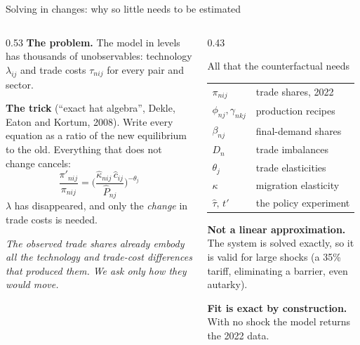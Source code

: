 \documentclass[aspectratio=169,9pt,t]{beamer}
\newcommand{\h}[1]{\hat{#1}}
\newcommand{\plain}[1]{{\color{ipgrey}\small\itshape #1}}
\begin{document}
\begin{frame}{Solving in changes: why so little needs to be estimated}
  \begin{columns}[T]
    \begin{column}{0.53\textwidth}
      \textbf{The problem.} The model in levels has thousands of
      unobservables: technology $\lambda_{ij}$ and trade costs
      $\tau_{nij}$ for every pair and sector.

      \medskip
      \textbf{The trick} (``exact hat algebra'', Dekle, Eaton and Kortum,
      2008). Write every equation as a ratio of the new equilibrium to
      the old. Everything that does not change cancels:
      \[ \frac{\pi'_{nij}}{\pi_{nij}}
         =\Big(\frac{\h\kappa_{nij}\,\h c_{ij}}{\h P_{nj}}\Big)^{-\theta_j} \]
      $\lambda$ has disappeared, and only the \emph{change} in trade
      costs is needed.

      \medskip
      \plain{The observed trade shares already embody all the
      technology and trade-cost differences that produced them. We ask
      only how they would move.}
    \end{column}
    \begin{column}{0.43\textwidth}
      \begin{block}{All that the counterfactual needs}
        \small
        \begin{tabular}{@{}ll@{}}
          $\pi_{nij}$ & trade shares, 2022\\
          $\phi_{nj},\gamma_{nkj}$ & production recipes\\
          $\beta_{nj}$ & final-demand shares\\
          $D_n$ & trade imbalances\\
          $\theta_j$ & trade elasticities\\
          $\kappa$ & migration elasticity\\
          $\h\tau,\,t'$ & the policy experiment\\
        \end{tabular}
      \end{block}
      \small
      \textbf{Not a linear approximation.} The system is solved
      exactly, so it is valid for large shocks (a 35\% tariff,
      eliminating a barrier, even autarky).

      \smallskip
      \textbf{Fit is exact by construction.} With no shock the model
      returns the 2022 data.
    \end{column}
  \end{columns}
\end{frame}
\end{document}
